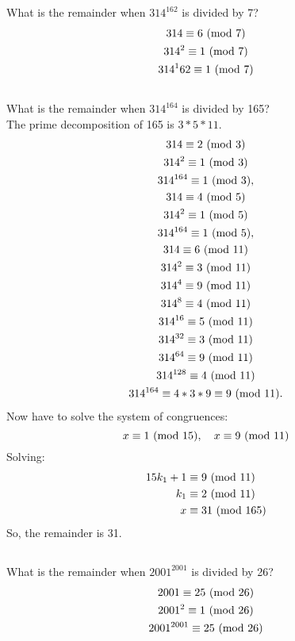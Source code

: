 \documentclass{article}
\begin{document}
\subsection{}
What is the remainder when $314^{162}$ is divided by 7?
\begin{gather*}
    314 \equiv 6 \ (\mathrm{mod}\ 7)\\
    314^2 \equiv 1 \ (\mathrm{mod}\ 7)\\
    314^162 \equiv 1 \ (\mathrm{mod}\ 7)
\end{gather*}

\subsection{}
What is the remainder when $314^{164}$ is divided by 165?\\
The prime decomposition of 165 is $3 * 5 * 11$.
\begin{gather*}
    314 \equiv 2 \ (\mathrm{mod}\ 3)\\
    314^2 \equiv 1 \ (\mathrm{mod}\ 3)\\
    314^{164} \equiv 1 \ (\mathrm{mod}\ 3),\\
    314 \equiv 4 \ (\mathrm{mod}\ 5)\\
    314^2 \equiv 1 \ (\mathrm{mod}\ 5)\\
    314^{164} \equiv 1 \ (\mathrm{mod}\ 5),\\
    314 \equiv 6 \ (\mathrm{mod}\ 11)\\
    314^2 \equiv 3 \ (\mathrm{mod}\ 11)\\
    314^4 \equiv 9 \ (\mathrm{mod}\ 11)\\
    314^8 \equiv 4 \ (\mathrm{mod}\ 11)\\
    314^{16} \equiv 5 \ (\mathrm{mod}\ 11)\\
    314^{32} \equiv 3 \ (\mathrm{mod}\ 11)\\
    314^{64} \equiv 9 \ (\mathrm{mod}\ 11)\\
    314^{128} \equiv 4 \ (\mathrm{mod}\ 11)\\
    314^{164} \equiv 4 * 3 * 9 \equiv 9 \ (\mathrm{mod}\ 11).
\end{gather*}
Now have to solve the system of congruences:
\begin{equation*}
    x \equiv 1 \ (\mathrm{mod}\ 15), \quad
    x \equiv 9 \ (\mathrm{mod}\ 11)
\end{equation*}
Solving:
\begin{align*}
    15k_1 + 1 &\equiv 9 \ (\mathrm{mod}\ 11)\\
    k_1 &\equiv 2 \ (\mathrm{mod}\ 11)\\
    x &\equiv 31 \ (\mathrm{mod}\ 165)
\end{align*}
So, the remainder is 31.

\subsection{}
What is the remainder when $2001^{2001}$ is divided by 26?
\begin{gather*}
    2001 \equiv 25 \ (\mathrm{mod}\ 26)\\
    2001^2 \equiv 1 \ (\mathrm{mod}\ 26)\\
    2001^{2001} \equiv 25 \ (\mathrm{mod}\ 26)
\end{gather*}
\end{document}
